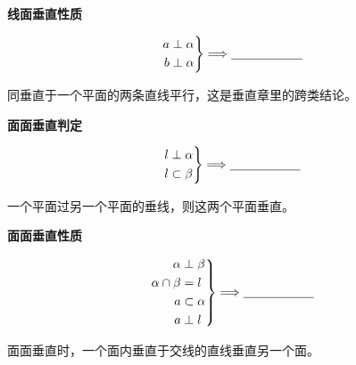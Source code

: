\documentclass{exam-zh}
\begin{document}
\begin{question}[points=5]
  \textbf{线面垂直性质}\par
\[
\left.
\begin{aligned}
a&\perp\alpha\\
b&\perp\alpha
\end{aligned}
\right\}
\Longrightarrow
\underline{\hspace{20mm}}
\]


  \paren[$a\parallel b$]
  \begin{solutionblock}
    同垂直于一个平面的两条直线平行，这是垂直章里的跨类结论。
  \end{solutionblock}
\end{question}



\begin{question}[points=5]
  \textbf{面面垂直判定}\par
\[
\left.
\begin{aligned}
l&\perp\alpha\\
l&\subset\beta
\end{aligned}
\right\}
\Longrightarrow
\underline{\hspace{20mm}}
\]


  \paren[$\alpha\perp\beta$]
  \begin{solutionblock}
    一个平面过另一个平面的垂线，则这两个平面垂直。
  \end{solutionblock}
\end{question}



\begin{question}[points=5]
  \textbf{面面垂直性质}\par
\[
\left.
\begin{aligned}
\alpha&\perp\beta\\
\alpha\cap\beta&=l\\
a&\subset\alpha\\
a&\perp l
\end{aligned}
\right\}
\Longrightarrow
\underline{\hspace{20mm}}
\]


  \begin{solutionblock}
    面面垂直时，一个面内垂直于交线的直线垂直另一个面。
  \end{solutionblock}
\end{question}
\end{document}
